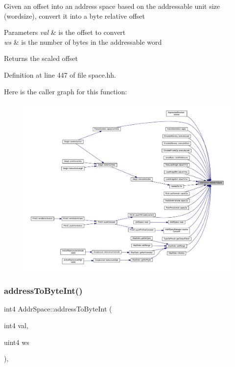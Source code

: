 Given an offset into an address space based on the addressable unit size (wordsize), convert it into a byte relative offset 
\begin{DoxyParams}{Parameters}
{\em val} & is the offset to convert \\
\hline
{\em ws} & is the number of bytes in the addressable word \\
\hline
\end{DoxyParams}
\begin{DoxyReturn}{Returns}
the scaled offset 
\end{DoxyReturn}


Definition at line 447 of file space.\+hh.

Here is the caller graph for this function\+:
\nopagebreak
\begin{figure}[H]
\begin{center}
\leavevmode
\includegraphics[width=350pt]{class_addr_space_af5925a4ae67a290f59bf17533fac62b4_icgraph}
\end{center}
\end{figure}
\mbox{\label{class_addr_space_a18aa860242e1e753b3ad786a0aa1b36e}} 
\subsubsection{\texorpdfstring{addressToByteInt()}{addressToByteInt()}}
{\footnotesize\ttfamily int4 Addr\+Space\+::address\+To\+Byte\+Int (\begin{DoxyParamCaption}\item[{int4}]{val,  }\item[{uint4}]{ws }\end{DoxyParamCaption})\hspace{0.3cm}{\ttfamily [inline]}, {\ttfamily [static]}}



